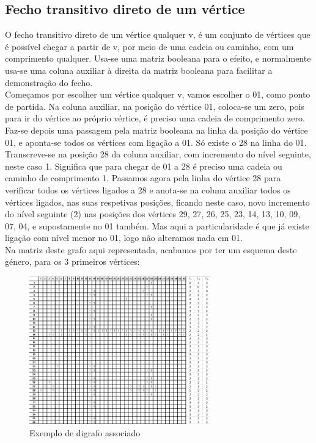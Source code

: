 \subsection{  Fecho transitivo direto de um vértice }
O fecho transitivo direto de um vértice qualquer v, é um conjunto de vértices que é possível chegar a
partir de v, por meio de uma cadeia ou caminho, com um comprimento qualquer. Usa-se uma matriz booleana 
para o efeito, e normalmente usa-se uma coluna auxiliar à direita da matriz booleana para facilitar a 
demonstração do fecho.\\
\indent Começamos por escolher um vértice qualquer v, vamos escolher o 01, como ponto de partida. Na coluna
auxiliar, na posição do vértice 01, coloca-se um zero, pois para ir do vértice ao próprio vértice, é preciso uma 
cadeia de comprimento zero. Faz-se depois uma passagem pela matriz booleana na linha da posição do vértice
01, e aponta-se todos os vértices com ligação a 01. Só existe o 28 na linha do 01. Transcreve-se na posição 28
da coluna auxiliar, com incremento do nível seguinte, neste caso 1. Significa que para chegar de 01 a 28 é 
preciso uma cadeia ou caminho de comprimento 1. Passamos agora pela linha do vértice 28 para verificar
todos os vértices ligados a 28 e anota-se na coluna auxiliar todos os vértices ligados, nas suas respetivas 
posições, ficando neste caso, novo incremento do nível seguinte (2) nas posições dos vértices 29, 27, 26, 25, 
23, 14, 13, 10, 09, 07, 04, e supostamente no 01 também. Mas aqui a particularidade é que já existe ligação 
com nível menor no 01, logo não alteramos nada em 01.\\
\indent Na matriz deste grafo aqui representada, acabamos por ter um esquema deste género, para os 3 
primeiros vértices:
\begin{figure}[h]
    \centering
    \includegraphics[width=0.7\textwidth]{imgs/Figura14}
    \caption{Exemplo de digrafo associado\label{fig:imagem15}}
\end{figure}\\
